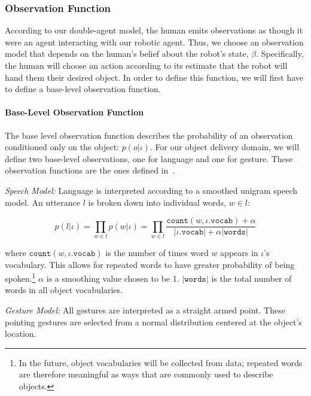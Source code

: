 \documentclass[conference]{IEEEtran}
\begin{document}
\subsubsection{Observation Function} \label{sssec:of}

According to our double-agent model, the human emits observations as though it were an agent interacting with our robotic agent. Thus, we choose an observation model that depends on the human's belief about the robot's state, $\beta$. Specifically, the human will choose an action according to its estimate that the robot will hand them their desired object. In order to define this function, we will first have to define a base-level observation function. 

\paragraph{Base-Level Observation Function} \label{baseobs}

The base level observation function describes the probability of an observation conditioned only on the object: $p(o|\iota)$. For our object delivery domain, we will define two base-level observations, one for language and one for gesture. These observation functions are the ones defined in~\citet{whitney16}. 

\vspace{0.5em}

\noindent\textit{Speech Model:} Language is interpreted according to a smoothed unigram speech model. An utterance $l$ is broken down into individual words, $w \in l$: 

\begin{equation*}
	p(l|\iota) = \prod_{w \in l} p(w|\iota) = \prod_{w\in l} \frac{\texttt{count}(w, \iota.\texttt{vocab}) + \alpha}{|\iota.\texttt{vocab}| + \alpha |\texttt{words}|}
\end{equation*}

where $\texttt{count}(w, \iota.\texttt{vocab})$ is the number of times word $w$ appears in $\iota$'s vocabulary. This allows for repeated words to have greater probability of being spoken.\footnote{In the future, object vocabularies will be collected from data; repeated words are therefore meaningful as ways that are commonly used to describe objects.}  $\alpha$ is a smoothing value chosen to be 1.  $|\texttt{words}|$ is the total number of words in all object vocabularies. 
\vspace{0.5em}

\noindent\textit{Gesture Model:} All gestures are interpreted as a straight armed point. These pointing gestures are selected from a normal distribution centered at the object's location. 
\end{document}
